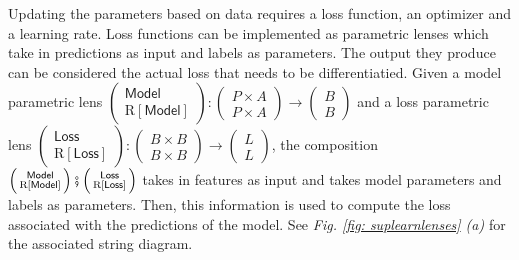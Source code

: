\documentclass[11pt,a4paper,openright,twoside]{report}
\theoremstyle{plain}
\theoremstyle{definition}
\begin{document}
Updating the parameters based on data requires a loss function, an optimizer and a learning rate. Loss functions can be implemented as parametric lenses which take in predictions as input and labels as parameters. The output they produce can be considered the actual loss that needs to be differentiatied. Given a model parametric lens $\left(\begin{smallmatrix} \mathsf{Model} \\ \mathrm{R}[\mathsf{Model}] \end{smallmatrix}\right):\left(\begin{smallmatrix} P \times A \\ P \times A \end{smallmatrix}\right) \to \left(\begin{smallmatrix} B \\ B \end{smallmatrix}\right)$ and a loss parametric lens $\left(\begin{smallmatrix} \mathsf{Loss} \\ \mathrm{R}[\mathsf{Loss}] \end{smallmatrix}\right):\left(\begin{smallmatrix} B \times B\\ B \times B \end{smallmatrix}\right) \to \left(\begin{smallmatrix} L \\ L \end{smallmatrix}\right)$, the composition $\left(\begin{smallmatrix} \mathsf{Model} \\ \mathrm{R}[\mathsf{Model}] \end{smallmatrix}\right) \fatsemi \left(\begin{smallmatrix} \mathsf{Loss} \\ \mathrm{R}[\mathsf{Loss}] \end{smallmatrix}\right)$ takes in features as input and takes model parameters and labels as parameters. Then, this information is used to compute the loss associated with the predictions of the model. See \textit{Fig. \ref{fig: suplearnlenses} (a)} for the associated string diagram.
\end{document}
